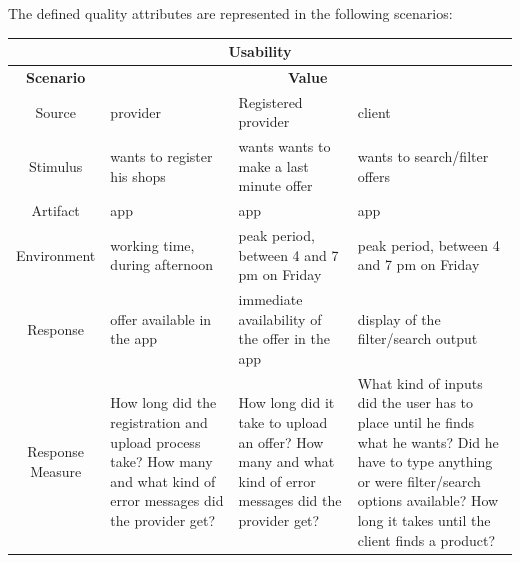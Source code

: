 \newpage
The defined quality attributes are represented in the following scenarios:

\begin{table}[H]
    \begin{tabularx}{\textwidth}{|c|X|X|X|}
        \hline
        \multicolumn{4}{c}{\textbf{Usability}} \\
        \hline
        \toprule
        \multicolumn{1}{|c|}{\textbf{Scenario}} & \multicolumn{3}{|c|}{\textbf{Value}} \\
        \midrule
        Source & \Gls{provider} & Registered \Gls{provider} & \Gls{client}  \\
        \hline
        Stimulus & wants to register his shops & wants wants to make a last minute offer & wants to search/filter offers \\
        \hline
        Artifact & app & app & app \\
        \hline
        Environment & working time, during afternoon & peak period, between 4 and 7 pm on Friday & peak period, between 4 and 7 pm on Friday \\
        \hline
        Response & offer available in the app & immediate availability of the offer in the app & display of the filter/search output \\
        \hline
        Response Measure & How long did the registration and upload process take? How many and what kind of error messages did the \gls{provider} get?
        & How long did it take to upload an offer? How many and what kind of error messages did the \gls{provider} get? 
        & What kind of inputs did the user has to place until he finds what he wants? Did he have to type anything or were filter/search
        options available? How long it takes until the client finds a product? \\
        \bottomrule
    \end{tabularx}
\end{table}


